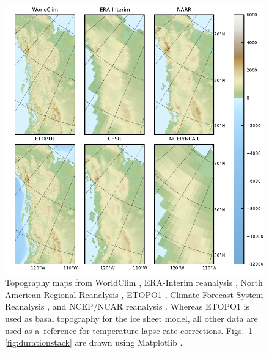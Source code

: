 \documentclass[tc, ms]{copernicus}
\begin{document}
\begin{figure}[t]
	\vspace*{2mm}
	\begin{center}
		\includegraphics{cordillera-climate-topo}
	\end{center}
	\caption{Topography maps from WorldClim \citep{data:worldclim}, ERA-Interim reanalysis \citep{data:erai}, North American Regional Reanalysis \citep[NARR;][]{data:narr}, ETOPO1 \citep{data:etopo1}, Climate Forecast System Reanalysis \citep[CFSR;][]{data:cfsr}, and NCEP/NCAR reanalysis \citep{data:ncar}. Whereas ETOPO1 is used as basal topography for the ice sheet model, all other data are used as a~reference for temperature lapse-rate corrections. Figs.~\ref{fig:topo}--\ref{fig:durationstack} are drawn using Matplotlib \citep{soft:mpl}.}
	\label{fig:topo}
\end{figure}
\end{document}
